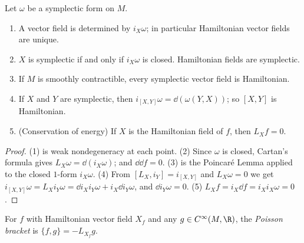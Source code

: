 \begin{theorem}
  \label{thm:hamiltonian-fields}
  \leanok
  Let $\omega$ be a symplectic form on $M$.
  \begin{enumerate}
    \item A vector field is determined by $i_X\omega$; in particular Hamiltonian vector fields
      are unique.
    \item $X$ is symplectic if and only if $i_X\omega$ is closed. Hamiltonian fields are
      symplectic.
    \item If $M$ is smoothly contractible, every symplectic vector field is Hamiltonian.
    \item If $X$ and $Y$ are symplectic, then $i_{[X, Y]}\omega = \dd(\omega(Y, X))$; so
      $[X, Y]$ is Hamiltonian.
    \item (Conservation of energy) If $X$ is the Hamiltonian field of $f$, then $L_X f = 0$.
  \end{enumerate}
\end{theorem}

\begin{proof}
  \leanok
  (1) is weak nondegeneracy at each point. (2) Since $\omega$ is closed, Cartan's formula gives
  $L_X \omega = \dd(i_X\omega)$; and $\dd \dd f = 0$. (3) is the Poincaré Lemma applied to the
  closed $1$-form $i_X\omega$. (4) From $[L_X, i_Y] = i_{[X, Y]}$ and $L_X\omega = 0$ we get
  $i_{[X, Y]}\omega = L_X i_Y\omega = \dd i_X i_Y \omega + i_X \dd i_Y\omega$, and
  $\dd i_Y \omega = 0$. (5) $L_X f = i_X \dd f = i_X i_X \omega = 0$.
\end{proof}

\begin{definition}
  \label{def:poisson}
  \leanok
  For $f$ with Hamiltonian vector field $X_f$ and any $g \in C^\infty(M, \R)$, the
  \emph{Poisson bracket} is $\{f, g\} = -L_{X_f} g$.
\end{definition}

